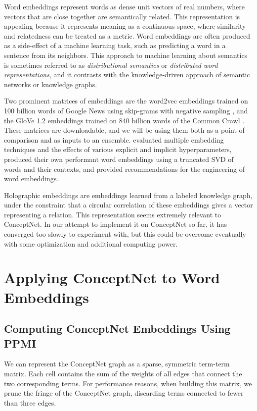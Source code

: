 \documentclass[letterpaper]{article}
\begin{document}
Word embeddings represent words as dense unit vectors of real numbers, where
vectors that are close together are semantically related. This representation
is appealing because it represents meaning as a continuous space, where
similarity and relatedness can be treated as a metric. Word embeddings are
often produced as a side-effect of a machine learning task, such as predicting
a word in a sentence from its neighbors.  This approach to machine learning
about semantics is sometimes referred to as \emph{distributional semantics} or
\emph{distributed word representations}, and it contrasts with the
knowledge-driven approach of semantic networks or knowledge graphs.

Two prominent matrices of embeddings are the word2vec embeddings trained on 100
billion words of Google News using skip-grams with negative sampling
\cite{mikolov2013word2vec}, and the GloVe 1.2 embeddings trained on 840 billion
words of the Common Crawl \cite{pennington2014glove}. These matrices are
downloadable, and we will be using them both as a point of comparison and as
inputs to an ensemble. \citeauthor{levy2015embeddings}
 evaluated multiple embedding techniques and the
effects of various explicit and implicit hyperparameters, produced their own
performant word embeddings using a truncated SVD of words and their contexts,
and provided recommendations for the engineering of word embeddings.

Holographic embeddings \cite{nickel2015holographic} are embeddings learned from
a labeled knowledge graph, under the constraint that a circular correlation of
these embeddings gives a vector representing a relation. This representation
seems extremely relevant to ConceptNet. In our attempt to implement it on
ConceptNet so far, it has converged too slowly to experiment with, but this
could be overcome eventually with some optimization and additional computing
power.

\section{Applying ConceptNet to Word Embeddings}

\subsection{Computing ConceptNet Embeddings Using PPMI}

We can represent the ConceptNet graph as a sparse, symmetric term-term matrix.
Each cell contains the sum of the weights of all edges that connect the two
corresponding terms. For performance reasons, when building this matrix, we
prune the fringe of the ConceptNet graph, discarding terms connected to fewer
than three edges.
\end{document}
